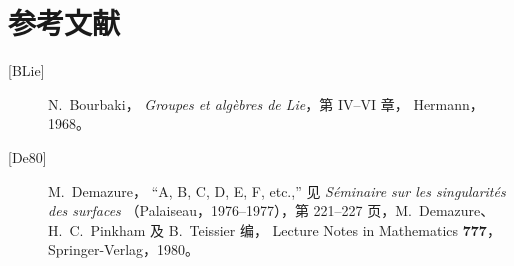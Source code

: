\section*{参考文献}
\label{sga3:XXI:bibliography}

\begin{description}
\item[{[BLie]}] N.~Bourbaki，
  \emph{Groupes et algèbres de Lie}，第 IV--VI 章，
  Hermann，1968。
\item[{[De80]}] M.~Demazure，
  ``A, B, C, D, E, F, etc.,'' 见
  \emph{Séminaire sur les singularités des surfaces}
  （Palaiseau，1976--1977），第 221--227 页，M.~Demazure、
  H.~C.~Pinkham 及 B.~Teissier 编，
  Lecture Notes in Mathematics \textbf{777}，
  Springer-Verlag，1980。
\end{description}
